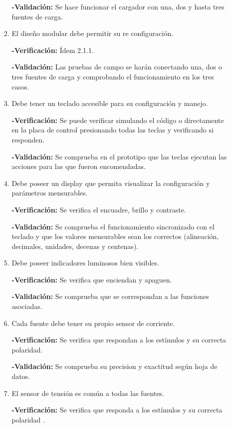 \documentclass[11pt]{charter}
\begin{document}
\begin{enumerate}
\begin{enumerate}[label*=\arabic*.]
\begin{enumerate}[label*=\arabic*.]
				\textbf{-Validación:}  Se hace funcionar el cargador con una, dos y hasta tres fuentes de carga.
		
				\item El diseño modular debe permitir su re configuración.
				
				
				\textbf{-Verificación:} Ídem 2.1.1.
		
				\textbf{-Validación:} Las pruebas de campo se harán conectando una, dos o tres fuentes de carga y comprobando el funcionamiento en los tres casos.
		
				\item Debe tener un teclado accesible para su configuración y manejo.
				
				\textbf{-Verificación:} Se puede verificar simulando el código o directamente en la placa de control presionando todas las teclas y verificando si responden.
		
				\textbf{-Validación:} Se comprueba en el prototipo que las teclas ejecutan las acciones  para las que fueron encomendadas.
				
				\item Debe poseer un display que permita visualizar la configuración y parámetros mensurables.
				
				\textbf{-Verificación:} Se verifica el encuadre, brillo y contraste.
		
				\textbf{-Validación:} Se comprueba el funcionamiento sincronizado con el teclado y que los valores mensurables sean los correctos (alineación, decimales, unidades, decenas y centenas).
				
				\item Debe poseer indicadores luminosos bien visibles.
				
				\textbf{-Verificación:} Se verifica que enciendan y apaguen.
		
				\textbf{-Validación:} Se comprueba que se correspondan a las funciones asociadas.
									
				\item Cada fuente debe tener su propio sensor de corriente.
				
				\textbf{-Verificación:} Se verifica que respondan a los estímulos y su correcta polaridad.
		
				\textbf{-Validación:} Se comprueba su precision y exactitud según hoja de datos. 
				
				\item El sensor de tensión es común a todas las fuentes.
				
				\textbf{-Verificación:} Se verifica que responda a los estímulos y su correcta polaridad .
		

\end{enumerate}
\end{enumerate}
\end{enumerate}
\end{document}
